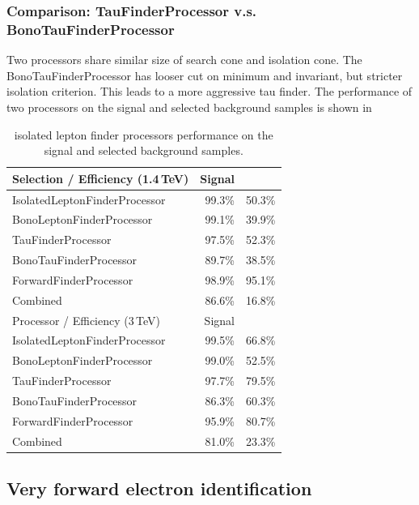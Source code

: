 \subsubsection{Comparison: TauFinderProcessor v.s. BonoTauFinderProcessor}

Two processors share similar size of search cone and isolation cone. The BonoTauFinderProcessor has looser cut on minimum \pT and invariant, but stricter isolation criterion. This leads to a more aggressive tau finder. The performance of two processors on the signal and selected background samples is shown in 

\begin{table}
\begin{tabular}{lrr}
\hline
\hline
Selection / Efficiency (1.4\,TeV)  &  Signal & \HepProcess{\Pquark\Pquark\Pquark\Pquark\Plepton\Pnu} \\
\hline
IsolatedLeptonFinderProcessor & 99.3\% & 50.3\%  \\
BonoLeptonFinderProcessor & 99.1\% & 39.9\%  \\
TauFinderProcessor & 97.5\% & 52.3\%  \\
BonoTauFinderProcessor & 89.7\% & 38.5\%  \\
ForwardFinderProcessor & 98.9\% & 95.1\%  \\
Combined & 86.6\% & 16.8\%  \\
\hline
Processor / Efficiency (3\,TeV)  &  Signal  & \HepProcess{\Pquark\Pquark\Pquark\Pquark\Plepton\Pnu} \\
\hline
IsolatedLeptonFinderProcessor & 99.5\% & 66.8\%  \\
BonoLeptonFinderProcessor & 99.0\% & 52.5\%  \\
TauFinderProcessor & 97.7\% & 79.5\%  \\
BonoTauFinderProcessor & 86.3\% & 60.3\%  \\
ForwardFinderProcessor & 95.9\% & 80.7\%  \\
Combined & 81.0\% & 23.3\%  \\


\hline

\end{tabular}
\caption{isolated lepton finder processors performance on the signal and selected background samples.}
\label{tab:doubleHiggsIsoLepPerformance}
\end{table}

\subsection{Very forward electron identification}

